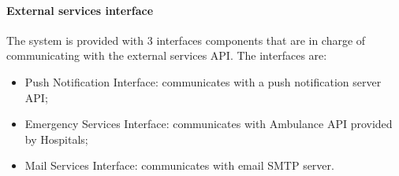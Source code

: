 \paragraph{External services interface} \mbox{} \newline
The system is provided with 3 interfaces components that are in charge of communicating with the external services API.
The interfaces are:
\begin{itemize}
    \item Push Notification Interface: communicates with a push notification server API;
    \item Emergency Services Interface: communicates with Ambulance API provided by Hospitals;
    \item Mail Services Interface: communicates with email SMTP server.
\end{itemize}


\paragraph{} \mbox{} \newline

